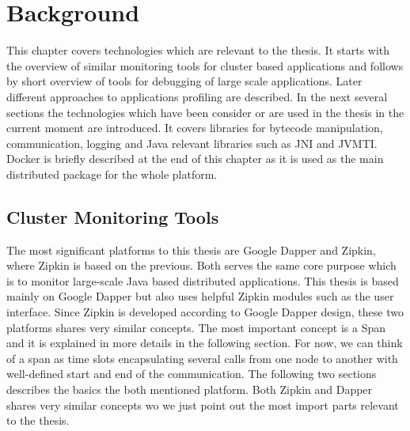 \chapter{Background}
\label{chap:background}
This chapter covers technologies which are relevant to the thesis. It starts with the overview of similar monitoring tools for cluster based applications and follows by short overview of tools for debugging of large scale applications. Later different approaches to applications profiling are described. 
In the next several sections the technologies which have been consider or are used in the thesis in the current moment are introduced. It covers libraries for bytecode manipulation, communication, logging and Java relevant libraries such as JNI and JVMTI. Docker is briefly described at the end of this chapter as it is used as the main distributed package for the whole platform.

\section{Cluster Monitoring Tools}
The most significant platforms to this thesis are Google Dapper and Zipkin, where Zipkin is based on the previous. Both serves the same core purpose which is to monitor large-scale Java based distributed applications. This thesis is based mainly on Google Dapper but also uses helpful Zipkin modules such as the user interface. Since Zipkin is developed according to Google Dapper design, these two platforms shares very similar concepts. The most important concept is a Span and it is explained in more details in the  following section. For now, we can think of a span as time slots encapsulating several calls from one node to another with well-defined start and end of the communication. The following two sections describes the basics the both mentioned platform. Both Zipkin and Dapper shares very similar concepts wo we just point out the most import parts relevant to the thesis.
